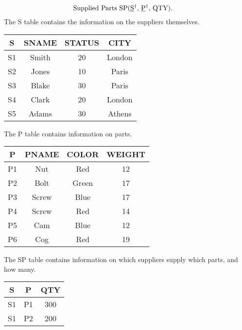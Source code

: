 \documentclass{report}
\begin{document}
\begin{itemize}
\begin{align*}
                &\text{Supplied Parts SP(\underline{S}$^{\dag}$, \underline{P}$^{\dag}$, QTY)}
            .\end{align*}
            \bigbreak \noindent 
            The S table contains the information on the suppliers themselves.
            \bigbreak \noindent 
            \begin{center}
                \begin{tabular}{c|c|c|c}
                    S &SNAME &STATUS &CITY \\
                    \hline
                    S1 &Smith &20 &London \\
                    S2 &Jones &10 &Paris \\
                    S3 &Blake &30 &Paris \\
                    S4 &Clark &20 &London \\
                    S5 &Adams &30 &Athens  
                \end{tabular}
            \end{center}
            \bigbreak \noindent 
            The P table contains information on parts.
            \bigbreak \noindent 
            \begin{center}
                \begin{tabular}{c|c|c|c}
                    P &PNAME &COLOR &WEIGHT \\
                    \hline
                    P1 &Nut &Red &12 \\
                    P2 &Bolt &Green &17 \\
                    P3 &Screw &Blue &17 \\
                    P4 &Screw &Red &14 \\
                    P5 &Cam &Blue &12 \\
                    P6 &Cog &Red &19 
                \end{tabular}
            \end{center}
            \bigbreak \noindent 
            The SP table contains information on which suppliers supply which parts, and how many.
            \bigbreak \noindent 
            \begin{center}
                \begin{tabular}{c|c|c}
                    S& P& QTY \\
                    \hline
                    S1 &P1 &300 \\
                    S1 &P2 &200 \\

\end{tabular}
\end{center}
\end{itemize}
\end{document}
